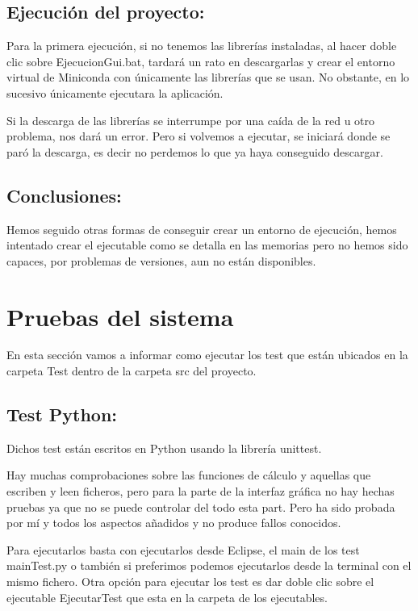 \subsection{Ejecución del proyecto:}
Para la primera ejecución, si no tenemos las librerías instaladas, al hacer doble clic sobre EjecucionGui.bat, tardará un rato en descargarlas y crear el entorno virtual de Miniconda con únicamente las librerías que se usan. No obstante, en lo sucesivo únicamente ejecutara la aplicación.

Si la descarga de las librerías se interrumpe por una caída de la red u otro problema, nos dará un error. Pero si volvemos a ejecutar, se iniciará donde se paró la descarga, es decir no perdemos lo que ya haya conseguido descargar.


\subsection{Conclusiones:}
Hemos seguido otras formas de conseguir crear un entorno de ejecución, hemos intentado crear el ejecutable como se detalla en las memorias pero no hemos sido capaces, por problemas de versiones, aun no están disponibles.



\section{Pruebas del sistema}
En esta sección vamos a informar como ejecutar los test que están ubicados en la carpeta Test dentro de la carpeta src del proyecto. 

\subsection{Test Python:}
Dichos test están escritos en Python usando la librería unittest.

Hay muchas comprobaciones sobre las funciones de cálculo y aquellas que escriben y leen ficheros, pero para la parte de la interfaz gráfica no hay hechas pruebas ya que no se puede controlar del todo esta part. Pero ha sido probada por mí y todos los aspectos añadidos y no produce fallos conocidos.

Para ejecutarlos basta con ejecutarlos desde Eclipse, el main de los test mainTest.py o también si preferimos podemos ejecutarlos desde la terminal con el mismo fichero.
Otra opción para ejecutar los test es dar doble clic sobre el ejecutable EjecutarTest que esta en la carpeta de los ejecutables. 

